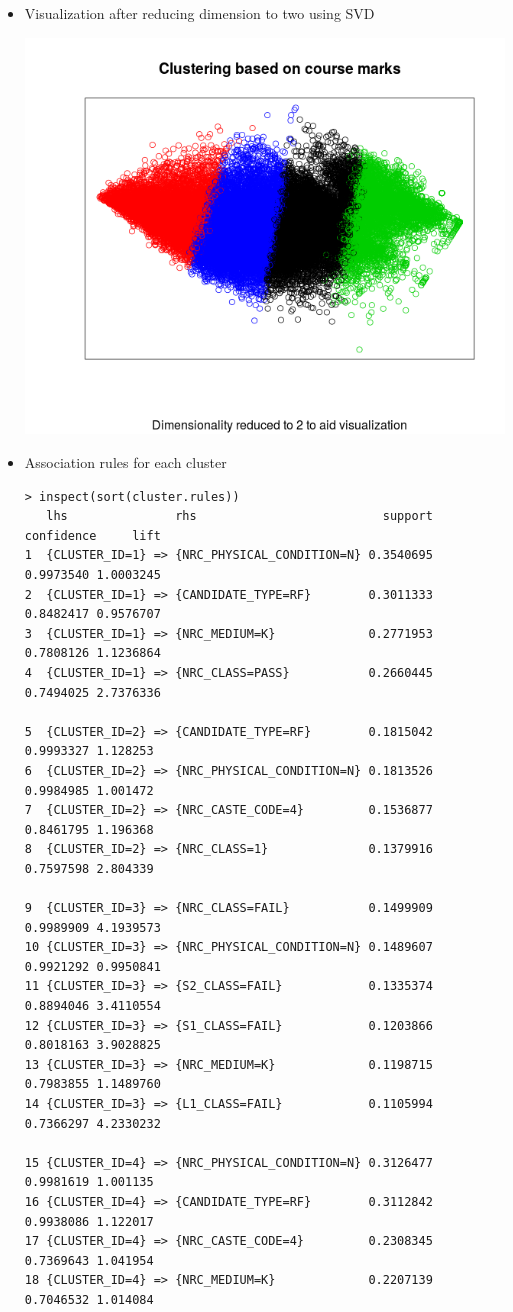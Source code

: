 \begin{itemize}
\item Visualization after reducing dimension to two using SVD

\includegraphics[scale=.5]{img/clusters_marks.png}




\item Association rules for each cluster
\begin{lstlisting}
> inspect(sort(cluster.rules))
   lhs               rhs                          support confidence     lift
1  {CLUSTER_ID=1} => {NRC_PHYSICAL_CONDITION=N} 0.3540695  0.9973540 1.0003245
2  {CLUSTER_ID=1} => {CANDIDATE_TYPE=RF}        0.3011333  0.8482417 0.9576707
3  {CLUSTER_ID=1} => {NRC_MEDIUM=K}             0.2771953  0.7808126 1.1236864
4  {CLUSTER_ID=1} => {NRC_CLASS=PASS}           0.2660445  0.7494025 2.7376336

5  {CLUSTER_ID=2} => {CANDIDATE_TYPE=RF}        0.1815042  0.9993327 1.128253
6  {CLUSTER_ID=2} => {NRC_PHYSICAL_CONDITION=N} 0.1813526  0.9984985 1.001472
7  {CLUSTER_ID=2} => {NRC_CASTE_CODE=4}         0.1536877  0.8461795 1.196368
8  {CLUSTER_ID=2} => {NRC_CLASS=1}              0.1379916  0.7597598 2.804339

9  {CLUSTER_ID=3} => {NRC_CLASS=FAIL}           0.1499909  0.9989909 4.1939573
10 {CLUSTER_ID=3} => {NRC_PHYSICAL_CONDITION=N} 0.1489607  0.9921292 0.9950841
11 {CLUSTER_ID=3} => {S2_CLASS=FAIL}            0.1335374  0.8894046 3.4110554
12 {CLUSTER_ID=3} => {S1_CLASS=FAIL}            0.1203866  0.8018163 3.9028825
13 {CLUSTER_ID=3} => {NRC_MEDIUM=K}             0.1198715  0.7983855 1.1489760
14 {CLUSTER_ID=3} => {L1_CLASS=FAIL}            0.1105994  0.7366297 4.2330232

15 {CLUSTER_ID=4} => {NRC_PHYSICAL_CONDITION=N} 0.3126477  0.9981619 1.001135
16 {CLUSTER_ID=4} => {CANDIDATE_TYPE=RF}        0.3112842  0.9938086 1.122017
17 {CLUSTER_ID=4} => {NRC_CASTE_CODE=4}         0.2308345  0.7369643 1.041954
18 {CLUSTER_ID=4} => {NRC_MEDIUM=K}             0.2207139  0.7046532 1.014084
\end{lstlisting}

\end{itemize}

